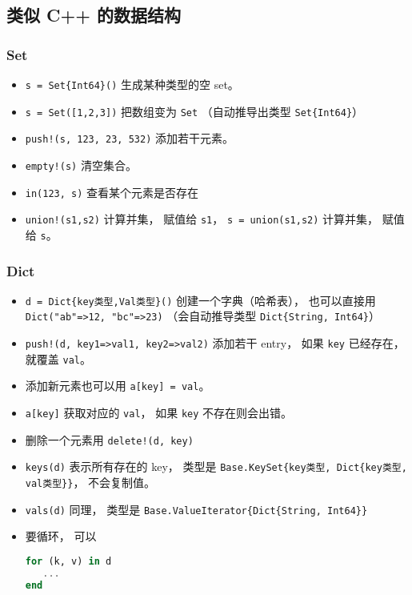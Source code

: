 \subsection{类似 C++ 的数据结构}
\subsubsection{Set}
\begin{itemize}
\item \verb|s = Set{Int64}()| 生成某种类型的空 set。
\item \verb|s = Set([1,2,3])| 把数组变为 \verb|Set| （自动推导出类型 \verb|Set{Int64}|）
\item \verb|push!(s, 123, 23, 532)| 添加若干元素。
\item \verb|empty!(s)| 清空集合。
\item \verb|in(123, s)| 查看某个元素是否存在
\item \verb|union!(s1,s2)| 计算并集， 赋值给 \verb|s1|， \verb|s = union(s1,s2)| 计算并集， 赋值给 \verb|s|。
\end{itemize}

\subsubsection{Dict}
\begin{itemize}
\item \verb|d = Dict{key类型,Val类型}()| 创建一个字典（哈希表）， 也可以直接用 \verb|Dict("ab"=>12, "bc"=>23)| （会自动推导类型 \verb|Dict{String, Int64}|）
\item \verb|push!(d, key1=>val1, key2=>val2)| 添加若干 entry， 如果 \verb|key| 已经存在， 就覆盖 \verb|val|。
\item 添加新元素也可以用 \verb|a[key] = val|。
\item \verb|a[key]| 获取对应的 \verb|val|， 如果 \verb|key| 不存在则会出错。
\item 删除一个元素用 \verb|delete!(d, key)|
\item \verb|keys(d)| 表示所有存在的 key， 类型是 \verb|Base.KeySet{key类型, Dict{key类型, val类型}}|， 不会复制值。
\item \verb|vals(d)| 同理， 类型是 \verb|Base.ValueIterator{Dict{String, Int64}}|
\item 要循环， 可以
\begin{lstlisting}[language=julia]
for (k, v) in d
   ...
end
\end{lstlisting}
\end{itemize}


